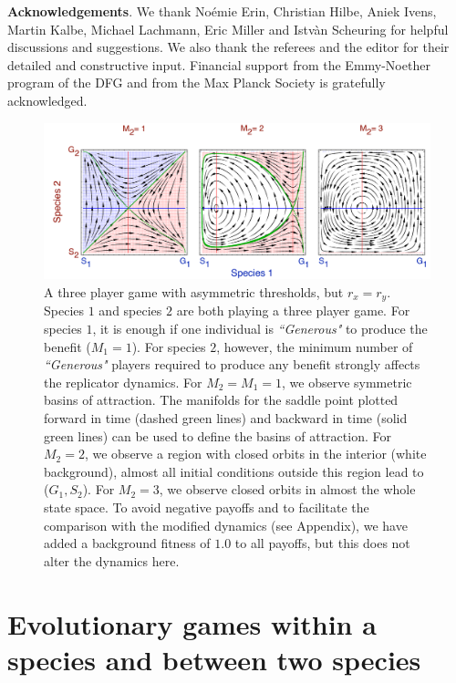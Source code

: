 \documentclass[aps,pre,amsfonts,floatfix, onecolumn,showkeys]{revtex4-1}
\begin{document}
\textbf{Acknowledgements}. We thank No\'emie Erin, Christian Hilbe, Aniek Ivens, Martin Kalbe, Michael Lachmann, Eric Miller and Istv\`an Scheuring  for helpful discussions and suggestions. 
We also thank the referees and the editor for their detailed and constructive input.
Financial support from the Emmy-Noether program of the DFG and from the Max Planck Society is gratefully acknowledged.


\begin{figure}[h]
\includegraphics[width=\columnwidth]{standardreplicator}
\caption{
A three player game with asymmetric thresholds, but $r_x=r_y$.
Species $1$ and species $2$ are both playing a three player game.
For species $1$, it is enough if one individual is \textit{``Generous"} to produce the benefit ($M_1 = 1$).
For species $2$, however, the minimum number of \textit{``Generous"} players required to produce any benefit 
strongly affects the replicator dynamics. 
For $M_2=M_1=1$, we observe symmetric basins of attraction.
The manifolds for the saddle point plotted forward in time (dashed green lines) and backward in time (solid green lines) can be used to define the basins of attraction.
For $M_2=2$, we observe a region with closed orbits in the interior (white background), almost all initial conditions outside this region lead to ($G_1,S_2$). 
For $M_2=3$, we observe closed orbits in almost the whole state space.
To avoid negative payoffs and to facilitate the comparison with the modified dynamics (see Appendix), we have added a background fitness of  $1.0$ to all payoffs, but this does not alter the dynamics here.
}
\label{fig:thresholdsrep}
\end{figure}


\appendix

\renewcommand{\theequation}{A.\arabic{equation}}
\renewcommand{\thefigure}{A.\arabic{figure}}

\section{
Evolutionary games within a species and between two species
}
\end{document}

